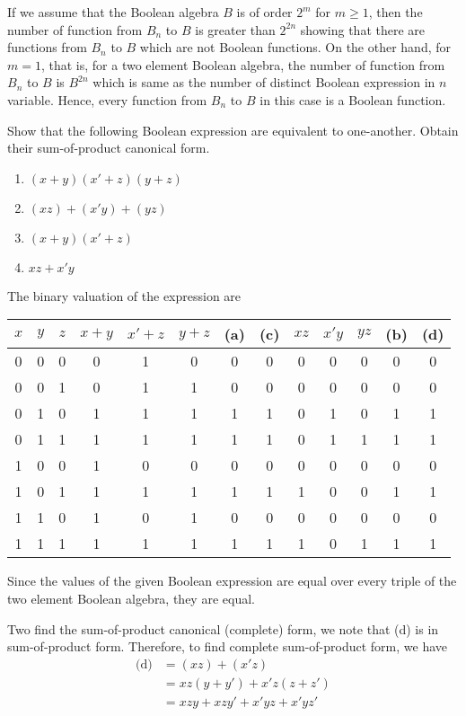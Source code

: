 \documentclass[../main-sheet.tex]{subfiles}
\begin{document}
If we assume that the Boolean algebra $ B $ is of order $ 2^m $ for $ m\geq 1 $, then the number of function from $ B_n $ to $ B $ is greater than $ 2^{2n} $ showing that there are functions from $ B_n $ to $ B $ which are not Boolean functions. On the other hand, for $ m=1 $, that is, for a two element Boolean algebra, the number of function from $ B_n $ to $ B $ is $ B^{2n} $ which is same as the number of distinct Boolean expression in $ n $ variable. Hence, every function from $ B_n $ to $ B $ in this case is a Boolean function.
\begin{prob}
    Show that the following Boolean expression are equivalent to one-another. Obtain their sum-of-product canonical form.
    \begin{enumerate}[label=(\alph*)]
        \item $ (x+y)(x'+z)(y+z) $
        \item $ (xz)+(x'y)+(yz) $
        \item $ (x+y)(x'+z) $
        \item $ xz+x'y $
    \end{enumerate}
\end{prob}
\begin{soln}
    The binary valuation of the expression are 
    \begin{table}[H]
        \centering
        \begin{tabular}{ccccccccccccc}
            \toprule
            $ x $ & $ y $ & $ z $& $ x+y $&$ x'+z $&$ y+z $&(a)&(c)&$ xz $&$ x'y $&$ yz $&(b)&(d) \\
            \midrule
            0 & 0 & 0 & 0 & 1 & 0  & 0  & 0  & 0  & 0  & 0  & 0  & 0 \\
            0 & 0 & 1 & 0 & 1 & 1  & 0  & 0  & 0  & 0  & 0  & 0  & 0 \\
            0 & 1 & 0 & 1 & 1 & 1  & 1  & 1  & 0  & 1  & 0  & 1  & 1 \\
            0 & 1 & 1 & 1 & 1 & 1  & 1  & 1  & 0  & 1  & 1  & 1  & 1 \\
            1 & 0 & 0 & 1 & 0 & 0  & 0  & 0  & 0  & 0  & 0  & 0  & 0 \\
            1 & 0 & 1 & 1 & 1 & 1  & 1  & 1  & 1  & 0  & 0  & 1  & 1 \\
            1 & 1 & 0 & 1 & 0 & 1  & 0  & 0  & 0  & 0  & 0  & 0  & 0 \\
            1 & 1 & 1 & 1 & 1 & 1  & 1  & 1  & 1  & 0  & 1  & 1  & 1 \\
            \bottomrule
        \end{tabular}
    \end{table}
    Since the values of the given Boolean expression are equal over every triple of the two element Boolean algebra, they are equal.

    Two find the sum-of-product canonical (complete) form, we note that (d) is in sum-of-product form. Therefore, to find complete sum-of-product form, we have
    \begin{align*}
        \text{(d)}&=(xz)+(x'z)\\
        &=xz(y+y')+x'z(z+z')\\
        &=xzy+xzy'+x'yz+x'yz'
    \end{align*}
\end{soln}
\end{document}
